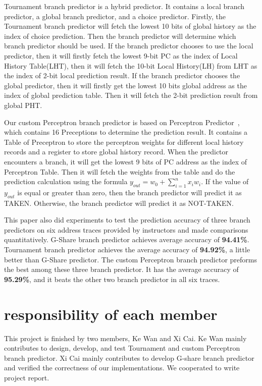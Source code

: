 \documentclass[conference]{IEEEtran}
\begin{document}
Tournament branch predictor is a hybrid predictor. It contains a local branch
predictor, a global branch predictor, and a choice predictor. Firstly, the Tournament branch predictor will fetch the lowest 10 bits of global history as the index of choice prediction. Then the branch predictor 
will determine which branch predictor should be used. If the branch predictor chooses to use the local predictor, then it will firstly fetch the lowest 9-bit PC as the index of Local History Table(LHT), then it 
will fetch the 10-bit Local History(LH) from LHT as the index of 2-bit local prediction result. If the branch predictor chooses the global predictor, then
it will firstly get the lowest 10 bits global address as the index of global prediction table. Then it will fetch the 2-bit prediction result from global PHT.

Our custom Perceptron branch predictor is based on Perceptron Predictor~\cite{nicepaper4}, which contains 16 Preceptions to determine the prediction result. It contains a Table of Preceptron to store the perceptron weights for different local
history records and a register to store global history record. When the predictor encounters a branch, it will get the lowest 9 bits of PC address as the index of Perceptron Table. Then it will fetch the weights from the table and do
the prediction calculation using the formula $y_{out}=w_0+\sum_{i=1}^{n}{x_iw_i}$. If the value of $y_{out}$ is equal or greater than zero, then the branch predictor will predict it as TAKEN. Otherwise, the branch predictor will predict it as NOT-TAKEN. 

This paper also did experiments to test the prediction accuracy of three branch predictors on six address traces provided by instructors and made comparisons quantitatively. 
G-Share branch predictor achieves average accuracy of \textbf{94.41\%}. Tournament branch predictor achieves the average accuracy of \textbf{94.92\%}, a little better than G-Share predictor. 
The custom Perceptron branch predictor preforms the best among these three branch predictor. It has the average accuracy of \textbf{95.29\%}, and it beats the other two branch predictor in all six traces. 


\section{responsibility of each member}
This project is finished by two members, Ke Wan and Xi Cai. Ke Wan mainly contributes to design, develop, and test Tournament 
and custom Perceptron branch predictor. Xi Cai mainly contributes to develop G-share branch predictor and verified the 
correctness of our implementations. We cooperated to write project report. 
\end{document}
